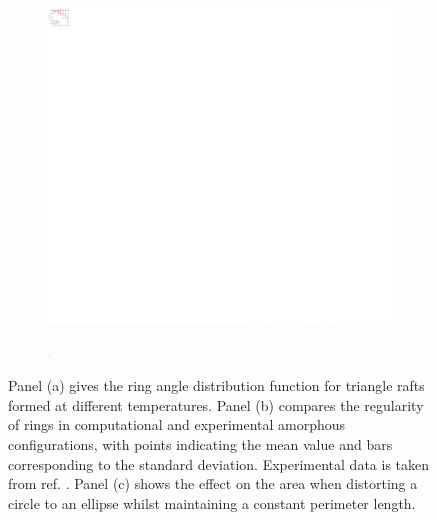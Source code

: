 \begin{figure}[bt]
     \begin{subfigure}[b]{0.45\textwidth}
         \centering
         \includegraphics[width=\textwidth]{./figures/bilayers/tri_raft_area.pdf}
         \caption{}
         \label{fig:trarea}
     \end{subfigure}
     \hfill
     \begin{subfigure}[b]{0.45\textwidth}
         \centering
         \includegraphics[width=\textwidth]{./figures/bilayers/ellipse_area.pdf}
         \caption{}
         \label{fig:trellipse}
     \end{subfigure}
     \hfill

     \caption{Panel (a) gives the ring angle distribution function for triangle rafts formed at different temperatures. Panel (b) compares the regularity of rings in computational and experimental amorphous configurations, with points indicating the mean value and bars corresponding to the standard deviation. Experimental data is taken from ref. \cite{Kumar2014}. Panel (c) shows the effect on the area when distorting a circle to an ellipse whilst maintaining a constant perimeter length.}
     \label{fig:trangarea}
\end{figure}

